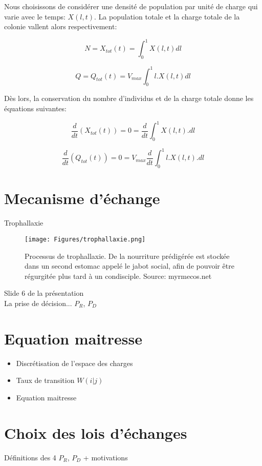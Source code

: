 Nous choisissons de considérer une densité de population par unité de charge qui varie avec le temps: $X(l,t)$.
La population totale et la charge totale de la colonie vallent alors respectivement:

\begin{equation}
N = X_{tot}(t) = \int^1_0X(l,t) dl
\label{Xtot}
\end{equation}

\begin{equation}
Q = Q_{tot}(t) = V_{max} \int^1_0 l.X(l,t) dl
\label{Qtot}
\end{equation}


Dès lors, la conservation du nombre d'individus et de la charge totale donne les équations suivantes:

\begin{equation}
\frac{d}{d t} (X_{tot}(t)) = 0 = \frac{d}{dt}\int^1_0 X(l,t).dl
\label{ConservationXtot}
\end{equation}

\begin{equation}
\frac{d}{d t} (Q_{tot}(t)) = 0 = V_{max} \frac{d}{dt}\int^1_0 l.X(l,t).dl
\label{ConservationQtot}
\end{equation}

\section{Mecanisme d'échange}
Trophallaxie

\begin{figure}[h]
\centering
\texttt{[image: Figures/trophallaxie.png]}
\caption{Processus de trophallaxie. De la nourriture prédigérée est stockée dans un second estomac appelé le jabot social, afin de pouvoir être régurgitée plus tard à un condisciple. Source: myrmecos.net}
\label{AntiLin2550}
\end{figure}

Slide 6 de la présentation\\

La prise de décision... $P_R$, $P_D$

\section{Equation maitresse}

\begin{itemize}
\item Discrétisation de l'espace des charges
\item Taux de transition $W(i|j)$
\item Equation maitresse
\end{itemize}

\section{Choix des lois d'échanges}

Définitions des 4 $P_R$, $P_D$ + motivations

